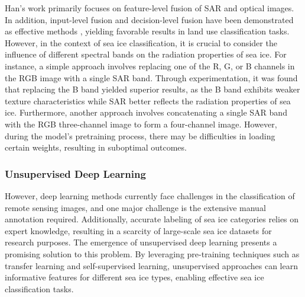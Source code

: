 Han's work primarily focuses on feature-level fusion of SAR and optical images. In addition, input-level fusion and decision-level fusion have been demonstrated as effective methods \cite{150li2022mcanet,151li2020collaborative,152li2023aligning}, yielding favorable results in land use classification tasks. However, in the context of sea ice classification, it is crucial to consider the influence of different spectral bands on the radiation properties of sea ice. For instance, a simple approach involves replacing one of the R, G, or B channels in the RGB image with a single SAR band. Through experimentation, it was found that replacing the B band yielded superior results, as the B band exhibits weaker texture characteristics while SAR better reflects the radiation properties of sea ice. Furthermore, another approach involves concatenating a single SAR band with the RGB three-channel image to form a four-channel image. However, during the model's pretraining process, there may be difficulties in loading certain weights, resulting in suboptimal outcomes.


\subsubsection{Unsupervised Deep Learning} 
However, deep learning methods currently face challenges in the classification of remote sensing images, and one major challenge is the extensive manual annotation required. Additionally, accurate labeling of sea ice categories relies on expert knowledge, resulting in a scarcity of large-scale sea ice datasets for research purposes. The emergence of unsupervised deep learning presents a promising solution to this problem. By leveraging pre-training techniques such as transfer learning and self-supervised learning, unsupervised approaches can learn informative features for different sea ice types, enabling effective sea ice classification tasks.

